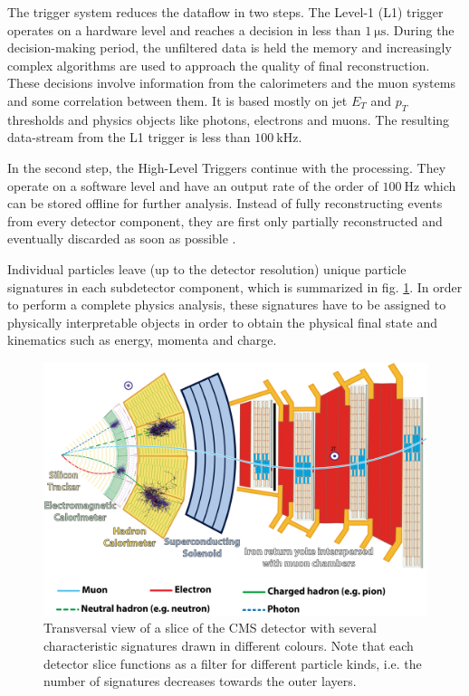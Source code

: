 The trigger system reduces the dataflow in two steps. The Level-1 (L1) trigger operates on a hardware level and reaches a decision in less than $\SI{1}{\micro\second}$. During the decision-making period, the unfiltered data is held the memory and increasingly complex algorithms are used to approach the quality of final reconstruction. These decisions involve information from the calorimeters and the muon systems and some correlation between them. It is based mostly on jet $E_T$ and $p_T$ thresholds and physics objects like photons, electrons and muons. The resulting data-stream from the L1 trigger is less than $\SI{100}{\kilo\hertz}$.

In the second step, the High-Level Triggers continue with the processing. They operate on a software level and have an output rate of the order of $\SI{100}{\hertz}$ which can be stored offline for further analysis. Instead of fully reconstructing events from every detector component, they are first only partially reconstructed and eventually discarded as soon as possible \cite{Bayatian:922757}.


Individual particles leave (up to the detector resolution) unique particle signatures in each subdetector component, which is summarized in fig. \ref{fig:cms_slice}. In order to perform a complete physics analysis, these signatures have to be assigned to physically interpretable objects in order to obtain the physical final state and kinematics such as energy, momenta and charge.

\begin{figure}[h!]
	\centering
	\includegraphics[width=0.8\linewidth]{figures/experiment/CMS_Slice}
	\caption{Transversal view of a slice of the CMS detector with several characteristic signatures drawn in different colours. Note that each detector slice functions as a filter for different particle kinds, i.e. the number of signatures decreases towards the outer layers. \cite{Barney:2120661}}
	\label{fig:cms_slice}
\end{figure}

